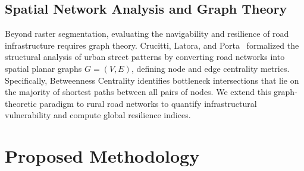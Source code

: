 \documentclass[conference]{IEEEtran}
\begin{document}
\subsection{Spatial Network Analysis and Graph Theory}
Beyond raster segmentation, evaluating the navigability and resilience of road infrastructure requires graph theory. Crucitti, Latora, and Porta~\cite{crucitti2006centrality} formalized the structural analysis of urban street patterns by converting road networks into spatial planar graphs $G = (V, E)$, defining node and edge centrality metrics. Specifically, Betweenness Centrality identifies bottleneck intersections that lie on the majority of shortest paths between all pairs of nodes. We extend this graph-theoretic paradigm to rural road networks to quantify infrastructural vulnerability and compute global resilience indices.

\begin{table}[t]
\centering
\caption{Comparative Summary of Existing Paradigms vs. Proposed MobileViT-Graph Architecture}
\label{tab:paradigm_comparison}
\end{table}

\section{Proposed Methodology}
\label{sec:methodology}
\end{document}
